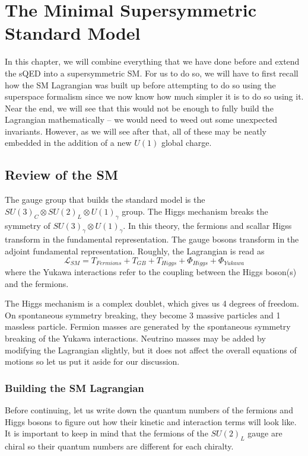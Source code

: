 \chapter{The Minimal Supersymmetric Standard Model}
  \label{ch:15}

In this chapter, we will combine everything that we have done before and extend the sQED into a supersymmetric SM. For us to do so, we will have to first recall how the SM Lagrangian was built up before attempting to do so using the superspace formalism since we now know how much simpler it is to do so using it. Near the end, we will see that this would not be enough to fully build the Lagrangian mathematically -- we would need to weed out some unexpected invariants. However, as we will see after that, all of these may be neatly embedded in the addition of a new $U(1)$ global charge. 

\section{Review of the SM}
  \label{ch:15:review of SM}

The gauge group that builds the standard model is the $SU(3)_C \otimes SU(2)_L \otimes U(1)_\gamma$ group. The Higgs mechanism breaks the symmetry of $SU(3)_\gamma \otimes U(1)_\gamma$. In this theory, the fermions and scallar Higss transform in the fundamental representation. The gauge bosons transform in the adjoint fundamental representation. Roughly, the Lagrangian is read as
\begin{equation}
    \mathcal{L}_{SM} = T_{Fermions} + T_{GB} + T_{Higgs} + \Phi_{Higgs} + \Phi_{Yukawa} 
\end{equation}
where the Yukawa interactions refer to the coupling between the Higgs boson(s) and the fermions.

The Higgs mechanism is a complex doublet, which gives us 4 degrees of freedom. On spontaneous symmetry breaking, they become 3 massive particles and 1 massless particle. Fermion masses are generated by the spontaneous symmetry breaking of the Yukawa interactions. Neutrino masses may be added by modifying the Lagrangian slightly, but it does not affect the overall equations of motions so let us put it aside for our discussion. 

  \subsection{Building the SM Lagrangian}
  Before continuing, let us write down the quantum numbers of the fermions and Higgs bosons to figure out how their kinetic and interaction terms will look like. It is important to keep in mind that the fermions of the $SU(2)_L$ gauge are chiral so their quantum numbers are different for each chiralty.
